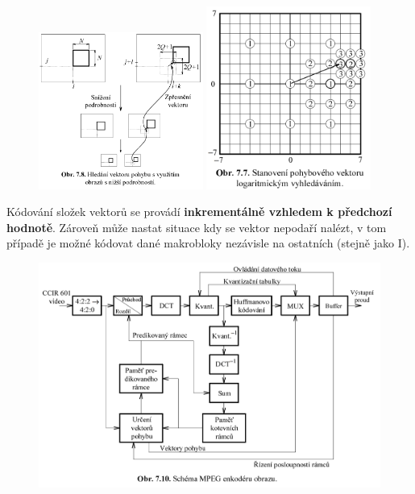 \begin{figure}[H]
	\centering
	\includegraphics[width=0.48\textwidth]{assets/7_mpeg_rekurze}
	\includegraphics[width=0.48\textwidth]{assets/7_mpeg_log}
\end{figure}

Kódování složek vektorů se provádí \textbf{inkrementálně vzhledem k předchozí hodnotě}. Zároveň může nastat situace kdy se vektor nepodaří nalézt, v tom případě je možné kódovat dané makrobloky nezávisle na ostatních (stejně jako I).

\begin{figure}[H]
	\centering
	\includegraphics[width=\textwidth]{assets/7_mpeg_schema}
\end{figure}

